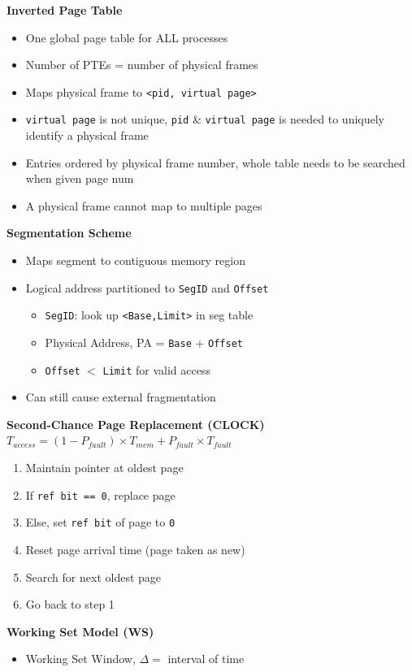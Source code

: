 \documentclass[a4paper, 12pt]{article}
\begin{document}
\begin{multicols*}{4}
\textbf{Inverted Page Table}
\begin{itemize}
	\item One global page table for ALL processes
	\item Number of PTEs = number of physical frames
	\item Maps physical frame to \texttt{<pid, virtual page>}
	\item \texttt{virtual page} is not unique, \texttt{pid} \& \texttt{virtual page} is needed to uniquely identify a physical frame
	\item Entries ordered by physical frame number, whole table needs to be searched when given page num
	\item A physical frame cannot map to multiple pages
\end{itemize}
\textbf{Segmentation Scheme}
\begin{itemize}
	\item Maps segment to contiguous memory region
	\item Logical address partitioned to \texttt{SegID} and \texttt{Offset}
	\begin{itemize}
		\item \texttt{SegID}: look up \texttt{<Base,Limit>} in seg table
		\item Physical Address, PA = \texttt{Base} + \texttt{Offset}
		\item \texttt{Offset} $<$ \texttt{Limit} for valid access
	\end{itemize}
	\item Can still cause external fragmentation
\end{itemize}
\textbf{Second-Chance Page Replacement (CLOCK)} \\
$T_{access} = (1-P_{fault}) \times T_{mem} + P_{fault} \times T_{fault}$
\begin{enumerate}
	\item Maintain pointer at oldest page
	\item If \texttt{ref bit == 0}, replace page
	\item Else, set \texttt{ref bit} of page to \texttt{0}
	\item Reset page arrival time (page taken as new)
	\item Search for next oldest page
	\item Go back to step 1
\end{enumerate}
\textbf{Working Set Model (WS)}
\begin{itemize}
	\item Working Set Window, $\Delta = $ interval of time

\end{itemize}
\end{multicols*}
\end{document}
